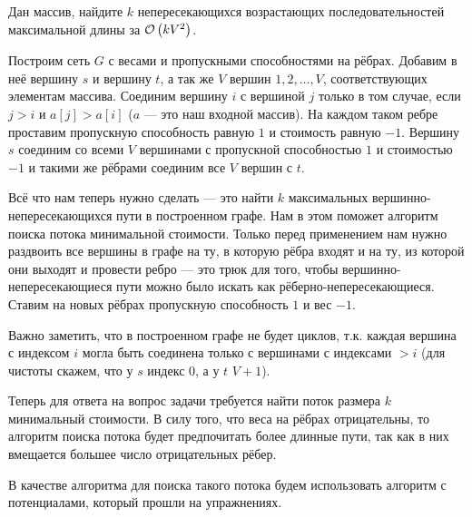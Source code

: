 \newpage
\begin{task}[2]
Дан массив, найдите $k$ непересекающихся возрастающих последовательностей максимальной длины за $\mathcal{O}\left(kV^2\right)$.
\end{task}
\begin{solution}
Построим сеть $G$ с весами и пропускными способностями на рёбрах. Добавим в неё вершину $s$ и вершину $t$, а так же $V$ вершин $1, 2, \ldots, V$, соответствующих элементам массива. Соединим вершину $i$ с вершиной $j$ только в том случае, если $j > i$ и $a[j] > a[i]$ ($a$ --- это наш входной массив). На каждом таком ребре проставим пропускную способность равную $1$ и стоимость равную $-1$. Вершину $s$ соединим со всеми $V$ вершинами с пропускной способностью $1$ и стоимостью $-1$ и такими же рёбрами соединим все $V$ вершин с $t$.

Всё что нам теперь нужно сделать --- это найти $k$ максимальных вершинно-непересекающихся пути в построенном графе. Нам в этом поможет алгоритм поиска потока минимальной стоимости. Только перед применением нам нужно раздвоить все вершины в графе на ту, в которую рёбра входят и на ту, из которой они выходят и провести ребро --- это трюк для того, чтобы вершинно-непересекающиеся пути можно было искать как рёберно-непересекающиеся. Ставим на новых рёбрах пропускную способность $1$ и вес $-1$. 

Важно заметить, что в построенном графе не будет циклов, т.к. каждая вершина с индексом $i$ могла быть соединена только с вершинами с индексами $> i$ (для чистоты скажем, что у $s$ индекс $0$, а у $t$ $V + 1$).

Теперь для ответа на вопрос задачи требуется найти поток размера $k$ минимальный стоимости. В силу того, что веса на рёбрах отрицательны, то алгоритм поиска потока будет предпочитать более длинные пути, так как в них вмещается большее число отрицательных рёбер.

В качестве алгоритма для поиска такого потока будем использовать алгоритм с потенциалами, который прошли на упражнениях. \xqed
\end{solution}

